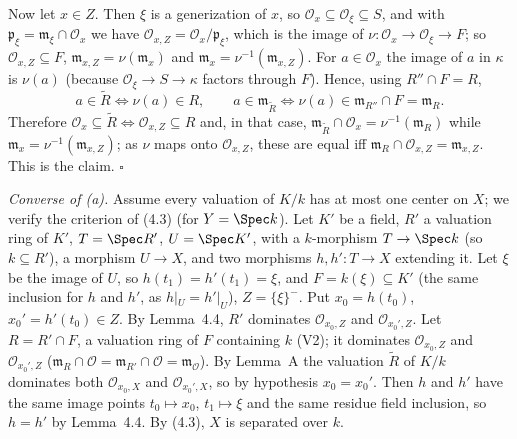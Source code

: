 \documentclass[11pt]{article}
\begin{document}
Now let $x\in Z$. Then $\xi$ is a generization of $x$, so $\mathcal O_x\subseteq\mathcal O_\xi\subseteq S$, and with $\mathfrak p_\xi=\mathfrak m_\xi\cap\mathcal O_x$ we have $\mathcal O_{x,Z}=\mathcal O_x/\mathfrak p_\xi$, which is the image of $\nu:\mathcal O_x\to\mathcal O_\xi\to F$; so $\mathcal O_{x,Z}\subseteq F$, $\mathfrak m_{x,Z}=\nu(\mathfrak m_x)$ and $\mathfrak m_x=\nu^{-1}(\mathfrak m_{x,Z})$. For $a\in\mathcal O_x$ the image of $a$ in $\kappa$ is $\nu(a)$ (because $\mathcal O_\xi\to S\to\kappa$ factors through $F$). Hence, using $R''\cap F=R$,
\[
a\in\tilde R\iff\nu(a)\in R,\qquad a\in\mathfrak m_{\tilde R}\iff\nu(a)\in\mathfrak m_{R''}\cap F=\mathfrak m_R.
\]
Therefore $\mathcal O_x\subseteq\tilde R\iff\mathcal O_{x,Z}\subseteq R$ and, in that case, $\mathfrak m_{\tilde R}\cap\mathcal O_x=\nu^{-1}(\mathfrak m_R)$ while $\mathfrak m_x=\nu^{-1}(\mathfrak m_{x,Z})$; as $\nu$ maps onto $\mathcal O_{x,Z}$, these are equal iff $\mathfrak m_R\cap\mathcal O_{x,Z}=\mathfrak m_{x,Z}$. This is the claim. $\square$

\emph{Converse of (a).} Assume every valuation of $K/k$ has at most one center on $X$; we verify the criterion of (4.3) (for $Y=\Spec k$). Let $K'$ be a field, $R'$ a valuation ring of $K'$, $T=\Spec R'$, $U=\Spec K'$, with a $k$-morphism $T\to\Spec k$ (so $k\subseteq R'$), a morphism $U\to X$, and two morphisms $h,h':T\to X$ extending it. Let $\xi$ be the image of $U$, so $h(t_1)=h'(t_1)=\xi$, and $F=k(\xi)\subseteq K'$ (the same inclusion for $h$ and $h'$, as $h|_U=h'|_U$), $Z=\{\xi\}^-$. Put $x_0=h(t_0)$, $x_0'=h'(t_0)\in Z$. By Lemma~4.4, $R'$ dominates $\mathcal O_{x_0,Z}$ and $\mathcal O_{x_0',Z}$. Let $R=R'\cap F$, a valuation ring of $F$ containing $k$ (V2); it dominates $\mathcal O_{x_0,Z}$ and $\mathcal O_{x_0',Z}$ ($\mathfrak m_R\cap\mathcal O=\mathfrak m_{R'}\cap\mathcal O=\mathfrak m_{\mathcal O}$). By Lemma~A the valuation $\tilde R$ of $K/k$ dominates both $\mathcal O_{x_0,X}$ and $\mathcal O_{x_0',X}$, so by hypothesis $x_0=x_0'$. Then $h$ and $h'$ have the same image points $t_0\mapsto x_0$, $t_1\mapsto\xi$ and the same residue field inclusion, so $h=h'$ by Lemma~4.4. By (4.3), $X$ is separated over $k$.
\end{document}
